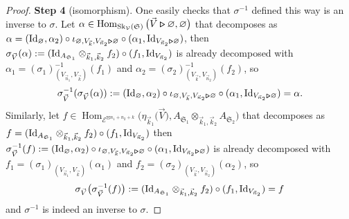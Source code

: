 \documentclass[pdftex]{sigma}%
\numberwithin{equation}{section}
\newcommand{\Hom}{\operatorname{Hom}}
\newcommand{\bmrhd}{\bm{\triangleright}}
\begin{document}
\begin{proof}
\medskip\noindent
\textbf{Step 4} (isomorphism). One easily checks that $\sigma^{-1}$ defined this way is an inverse to $\sigma$. Let $\alpha\in \Hom_{{\rm Sk}_\mathcal{V}(\mathfrak{S})}\big(\vec{V}\bmrhd\varnothing,\varnothing\big)$ that decomposes as $\alpha= ({\rm Id}_\varnothing , \alpha_2) \circ \iota_{\varnothing,V_{\vec{k}},V_{\vec{n}_2}\bmrhd\varnothing} \circ (\alpha_1 , {\rm Id}_{V_{\vec{n}_2}\bmrhd\varnothing})$, then $\sigma_{\vec{V}}(\alpha) := ({\rm Id}_{A_{\mathfrak{S}_1}} \otimes_{\vec{k}_1,\vec{k}_2} f_2) \circ (f_1 , {\rm Id}_{V_{\vec{n}_2}})$ is already decomposed with $\alpha_1 = (\sigma_1)^{-1}_{(V_{\vec{n}_1},V_{\vec{k}})}(f_1)$ and $\alpha_2 = (\sigma_2)_{(V_{\vec{k}},V_{\vec{n}_2})}^{-1}(f_2)$, so
\[
\sigma_{\vec{V}}^{-1}(\sigma_{\vec{V}}(\alpha)) := ({\rm Id}_\varnothing , \alpha_2) \circ \iota_{\varnothing,V_{\vec{k}},V_{\vec{n}_2}\bmrhd\varnothing} \circ (\alpha_1 , {\rm Id}_{V_{\vec{n}_2}\bmrhd\varnothing}) = \alpha.
\]
Similarly, let $f \in \Hom_{\mathcal{E}^{\boxtimes n_1+n_2+k}}\big(\eta_{\vec{k}_1}\big(\vec{V}\big),A_{\mathfrak{S}_1}\otimes_{\vec{k}_1,\vec{k}_2}A_{\mathfrak{S}_2}\big)$ that decomposes as $f=({\rm Id}_{A_{\mathfrak{S}_1}} \otimes_{\vec{k}_1,\vec{k}_2} f_2) \circ (f_1 , {\rm Id}_{V_{\vec{n}_2}})$ then $\sigma_{\vec{V}}^{-1}(f) := ({\rm Id}_\varnothing , \alpha_2) \circ \iota_{\varnothing,V_{\vec{k}},V_{\vec{n}_2}\bmrhd\varnothing} \circ (\alpha_1 , {\rm Id}_{V_{\vec{n}_2}\bmrhd\varnothing})$ is already decomposed with $f_1 = (\sigma_1)_{(V_{\vec{n}_1},V_{\vec{k}})}(\alpha_1)$ and $f_2 = (\sigma_2)_{(V_{\vec{k}},V_{\vec{n}_2})}(\alpha_2)$, so
\[
\sigma_{\vec{V}}\big(\sigma_{\vec{V}}^{-1}(f)\big) := ({\rm Id}_{A_{\mathfrak{S}_1}} \otimes_{\vec{k}_1,\vec{k}_2} f_2) \circ (f_1 , {\rm Id}_{V_{\vec{n}_2}})=f
\]
and $\sigma^{-1}$ is indeed an inverse to $\sigma$.
\end{proof}
\end{document}
